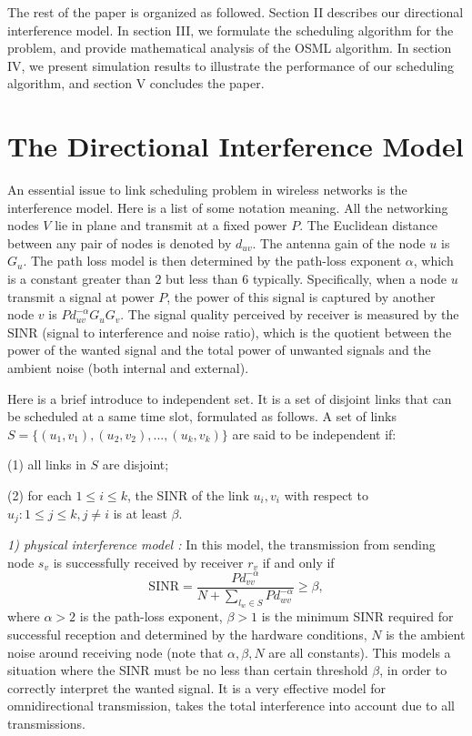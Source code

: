 \documentclass[conference]{IEEEtran}
\begin{document}
The rest of the paper is organized as followed. Section II describes our directional interference model. In section III, we formulate the scheduling algorithm for the problem, and provide mathematical analysis of the OSML algorithm. In section IV, we present simulation results to illustrate the performance of our scheduling algorithm, and section V concludes the paper.

\section{The Directional Interference Model}

An essential issue to link scheduling problem in wireless networks is the interference model. Here is a list of some notation meaning. All the networking nodes $V$ lie in plane and transmit at a fixed power $P$. The Euclidean distance between any pair of nodes is denoted by $d_{uv}$. The antenna gain of the node $u$ is $G_u$. The path loss model is then determined by the path-loss exponent $\alpha$, which is a constant greater than $2$ but less than $6$ typically. Specifically, when a node $u$ transmit a signal at power $P$, the power of this signal is captured by another node $v$ is $P d^{-\alpha}_{uv} G_u G_v$. The signal quality perceived by receiver is measured by the SINR (signal to interference and noise ratio), which is the quotient between the power of the wanted signal and the total power of unwanted signals and the ambient noise (both internal and external).

Here is a brief introduce to independent set. It is a set of disjoint links that can be scheduled at a same time slot, formulated as follows. A set of links $S=\{ (u_1,v_1),(u_2,v_2),...,(u_k,v_k) \}$ are said to be independent if:

(1) all links in $S$ are disjoint;

(2) for each $1 \leq i \leq k$, the SINR of the link $u_i,v_i$ with respect to ${u_j:1 \leq j \leq k,j \neq i}$ is at least $\beta$.

\emph{1) physical interference model \cite{11}:} In this model, the transmission from sending node $s_v$ is successfully received by receiver $r_v$ if and only if
\begin{equation}
  \textrm{SINR}=\frac{P d^{-\alpha}_{vv}}{N+ \sum _{l_w \in S}P   d^{- \alpha}_{wv} } \geq \beta,
\end{equation}
where $\alpha >2$ is the path-loss exponent, $\beta >1$ is the minimum SINR required for successful reception and determined by the hardware conditions, $N$ is the ambient noise around receiving node (note that $\alpha,\beta,N$ are all constants). This models a situation where the SINR must be no less than certain threshold $\beta$, in order to correctly interpret the wanted signal. It is a very effective model for omnidirectional transmission, takes the total interference into account due to all transmissions.
\end{document}
